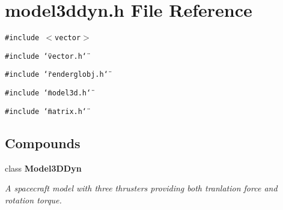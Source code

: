 \section{model3ddyn.h File Reference}
\label{model3ddyn_8h}
{\tt \#include $<$vector$>$}\par
{\tt \#include \char`\"{}vector.h\char`\"{}}\par
{\tt \#include \char`\"{}renderglobj.h\char`\"{}}\par
{\tt \#include \char`\"{}model3d.h\char`\"{}}\par
{\tt \#include \char`\"{}matrix.h\char`\"{}}\par
\subsection*{Compounds}
\begin{CompactItemize}
\item 
class {\bf Model3DDyn}
\begin{CompactList}\small\item\em A spacecraft model with three thrusters providing both tranlation force and rotation torque.\item\end{CompactList}\end{CompactItemize}

